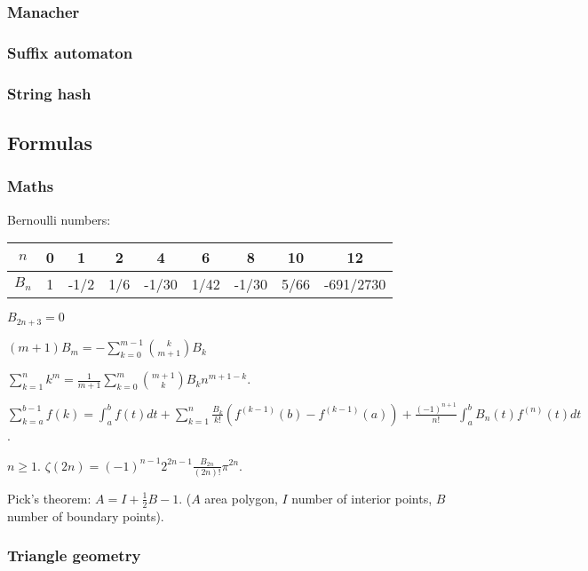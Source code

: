 \documentclass[landscape,a4paper,twocolumn,10pt]{report}
\begin{document}
\subsubsection*{Manacher}

\subsubsection*{Suffix automaton}

\subsubsection*{String hash}


\newpage
\subsection*{Formulas}

\subsubsection*{Maths}
Bernoulli numbers: \begin{tabular}{|c|c|c|c|c|c|c|c|c|}
\hline
$n$ & 0 & 1 & 2 & 4 & 6 & 8 & 10 & 12\\
\hline
$B_n$ & 1 & -1/2 & 1/6 & -1/30 & 1/42 & -1/30 & 5/66 & -691/2730 \\
\hline
\end{tabular}

\medskip

\noindent $B_{2n+3} = 0$

\medskip

\noindent $(m+1) B_m = - \sum_{k=0}^{m-1}\binom{k}{m+1}B_k$

\medskip

\noindent $\sum_{k=1}^nk^m=\frac{1}{m+1}\sum_{k=0}^m\binom{m+1}{k}B_kn^{m+1-k}$.

\medskip

\noindent $\sum_{k=a}^{b-1}f(k)=\int_a^bf(t)dt+\sum_{k=1}^n\frac{B_k}{k!}\left(f^{(k-1)}(b)-f^{(k-1)}(a)\right)+\frac{(-1)^{n+1}}{n!}\int_a^bB_n(t)f^{(n)}(t)dt$.

\medskip

\noindent $n\geq 1$. $\zeta(2n)=(-1)^{n-1}2^{2n-1}\frac{B_{2n}}{(2n)!}\pi^{2n}$.

\noindent Pick's theorem: $A=I+\frac{1}{2}B-1$. ($A$ area polygon, $I$ number of interior points, $B$ number of boundary points).

\subsubsection*{Triangle geometry}
\end{document}
